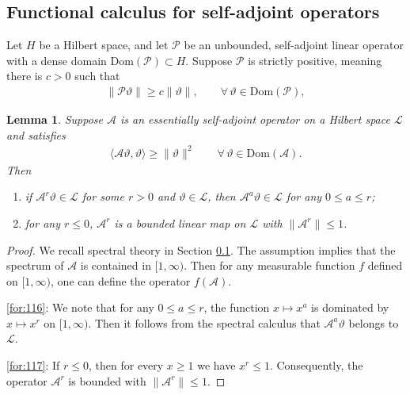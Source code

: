 \documentclass[10pt,a4paper]{amsart}
\newtheorem{lemma}{Lemma}
\newcommand{\norm}[1]{\lVert#1\rVert}
\begin{document}
\subsection{Functional calculus for self-adjoint operators}\label{sec:19} Let $H$ be a Hilbert space, and let
  $\mathcal{P}$ be an unbounded, self-adjoint linear operator with a dense domain $\text{Dom}(\mathcal{P})\subset H$. Suppose $\mathcal{P}$ is strictly positive, meaning there is $c>0$ such that
\begin{align*}
  \norm{\mathcal{P}\vartheta}\geq c\norm{\vartheta},\qquad \forall\,\vartheta\in \text{Dom}(\mathcal{P}),
\end{align*}

\begin{lemma}\label{ob:1} Suppose $\mathcal{A}$ is an essentially self-adjoint operator on a Hilbert space $\mathcal{L}$ and satisfies
\begin{align}\label{for:264}
 \langle \mathcal{A}\vartheta, \vartheta\rangle \geq\norm{\vartheta}^2\qquad \forall\, \vartheta\in \text{Dom}(\mathcal{A}).
\end{align} Then
\begin{enumerate}
  \item\label{for:116} if $\mathcal{A}^r\vartheta\in \mathcal{L}$ for some $r>0$ and $\vartheta\in \mathcal{L}$, then $\mathcal{A}^a\vartheta\in \mathcal{L}$ for any $0\leq a\leq r$;

  \smallskip
  \item\label{for:117} for any $r\leq 0$,  $\mathcal{A}^r$ is a bounded linear map on $\mathcal{L}$ with $\norm{\mathcal{A}^r}\leq 1$.
\end{enumerate}
\end{lemma}

\begin{proof} We recall spectral theory in Section \ref{sec:19}. The assumption implies that the spectrum of \(\mathcal{A}\) is contained in \([1,\infty)\). Then for any measurable function \(f\) defined on \([1,\infty)\), one can define the operator \(f(\mathcal{A})\).

\eqref{for:116}:  We note that for any \(0\leq a\leq r\), the function \(x\mapsto x^a\) is dominated by \(x\mapsto x^r\) on \([1,\infty)\).
Then  it follows from the spectral calculus that \(\mathcal{A}^a\vartheta\) belongs to \(\mathcal{L}\).

\eqref{for:117}: If \(r\leq 0\), then for every \(x\geq 1\) we have \(x^r\leq 1\). Consequently, the operator \(\mathcal{A}^r\) is bounded with \(\|\mathcal{A}^r\|\leq 1\).


\end{proof}
\end{document}
